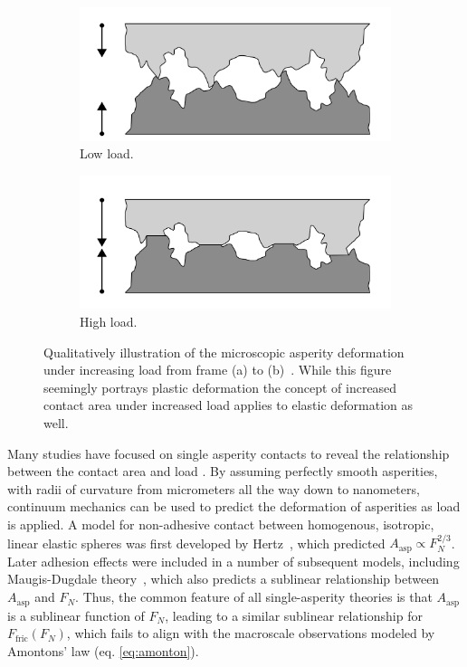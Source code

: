 \begin{figure}[H]
  \centering
  \begin{subfigure}[b]{0.49\textwidth}
      \centering
      \includegraphics[width=\textwidth]{figures/theory/asperities_top.png}
      \caption{Low load.}
      \label{fig:asp_left}
  \end{subfigure}
  \hfill
  \begin{subfigure}[b]{0.49\textwidth}
      \centering
      \includegraphics[width=\textwidth]{figures/theory/asperities_bottom.png}
      \caption{High load.}
      \label{fig:asp_right}
  \end{subfigure}
  \hfill
     \caption{Qualitatively illustration of the microscopic asperity deformation
     under increasing load from frame (a) to (b)~\cite{wiki:asperities}. While this figure seemingly portrays plastic deformation the concept of increased contact area under increased load applies to elastic deformation as well.}
     \label{fig:asperity_contact}
\end{figure}

Many studies have focused on single asperity contacts to reveal the relationship
between the contact area and load
\cite{Szlufarska_2008, PhysRevLett.56.930, perry_scanning_2004}. By
assuming perfectly smooth asperities, with radii of curvature from micrometers
all the way down to nanometers, continuum mechanics can be used to predict the
deformation of asperities as load is applied. A model for non-adhesive contact
between homogenous, isotropic, linear elastic spheres was first developed by
Hertz~\cite{HertzOnTC}, which predicted $A_{\text{asp}} \propto F_N^{2/3}$.
Later adhesion effects were included in a number of subsequent models, including
Maugis-Dugdale theory~\cite{MAUGIS1992243}, which also predicts a sublinear
relationship between $A_{\text{asp}}$ and $F_N$. Thus, the common feature of all
single-asperity theories is that $A_{\text{asp}}$ is a sublinear function of
$F_N$, leading to a similar sublinear relationship for $F_\text{fric}(F_N)$,
which fails to align with the macroscale observations modeled by Amontons’ law
(eq. \eqref{eq:amonton}).

